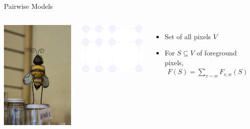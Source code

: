 \documentclass[mathserif]{beamer}
\begin{document}
\begin{frame}{Pairwise Models}
\vspace{0.5em}
\begin{columns}[c]
\centering
\includegraphics[width=1.85in]{figures/bee.jpg}

\includegraphics[width=1.7in]{figures/grid.pdf}

\vspace{1em}
\begin{itemize}
\item Set of all pixels $V$
\vspace{1em}
\item For $S \subseteq V$ of foreground pixels,
\begin{align*}
F(S) = \sum_{v \sim w} F_{v, w}(S)
\end{align*}
\end{itemize}
\end{columns}
\end{frame}
\end{document}
